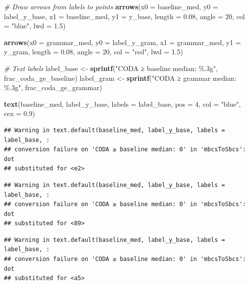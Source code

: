 \documentclass[
]{article}
\newenvironment{Shaded}{\begin{snugshade}}{\end{snugshade}}
\newcommand{\AttributeTok}[1]{\textcolor[rgb]{0.13,0.29,0.53}{#1}}
\newcommand{\CommentTok}[1]{\textcolor[rgb]{0.56,0.35,0.01}{\textit{#1}}}
\newcommand{\DecValTok}[1]{\textcolor[rgb]{0.00,0.00,0.81}{#1}}
\newcommand{\FloatTok}[1]{\textcolor[rgb]{0.00,0.00,0.81}{#1}}
\newcommand{\FunctionTok}[1]{\textcolor[rgb]{0.13,0.29,0.53}{\textbf{#1}}}
\newcommand{\NormalTok}[1]{#1}
\newcommand{\OtherTok}[1]{\textcolor[rgb]{0.56,0.35,0.01}{#1}}
\newcommand{\StringTok}[1]{\textcolor[rgb]{0.31,0.60,0.02}{#1}}
\begin{document}
\begin{Shaded}
\begin{Highlighting}[]
\CommentTok{\# Draw arrows from labels to points}
\FunctionTok{arrows}\NormalTok{(}\AttributeTok{x0 =}\NormalTok{ baseline\_med, }\AttributeTok{y0 =}\NormalTok{ label\_y\_base,}
       \AttributeTok{x1 =}\NormalTok{ baseline\_med, }\AttributeTok{y1 =}\NormalTok{ y\_base,}
       \AttributeTok{length =} \FloatTok{0.08}\NormalTok{, }\AttributeTok{angle =} \DecValTok{20}\NormalTok{, }\AttributeTok{col =} \StringTok{"blue"}\NormalTok{, }\AttributeTok{lwd =} \FloatTok{1.5}\NormalTok{)}

\FunctionTok{arrows}\NormalTok{(}\AttributeTok{x0 =}\NormalTok{ grammar\_med, }\AttributeTok{y0 =}\NormalTok{ label\_y\_gram,}
       \AttributeTok{x1 =}\NormalTok{ grammar\_med, }\AttributeTok{y1 =}\NormalTok{ y\_gram,}
       \AttributeTok{length =} \FloatTok{0.08}\NormalTok{, }\AttributeTok{angle =} \DecValTok{20}\NormalTok{, }\AttributeTok{col =} \StringTok{"red"}\NormalTok{, }\AttributeTok{lwd =} \FloatTok{1.5}\NormalTok{)}

\CommentTok{\# Text labels}
\NormalTok{label\_base }\OtherTok{\textless{}{-}} \FunctionTok{sprintf}\NormalTok{(}\StringTok{"CODA ≥ baseline median: \%.3g"}\NormalTok{, frac\_coda\_ge\_baseline)}
\NormalTok{label\_gram }\OtherTok{\textless{}{-}} \FunctionTok{sprintf}\NormalTok{(}\StringTok{"CODA ≥ grammar median: \%.3g"}\NormalTok{,  frac\_coda\_ge\_grammar)}

\FunctionTok{text}\NormalTok{(baseline\_med, label\_y\_base,}
     \AttributeTok{labels =}\NormalTok{ label\_base, }\AttributeTok{pos =} \DecValTok{4}\NormalTok{, }\AttributeTok{col =} \StringTok{"blue"}\NormalTok{, }\AttributeTok{cex =} \FloatTok{0.9}\NormalTok{)}
\end{Highlighting}
\end{Shaded}

\begin{verbatim}
## Warning in text.default(baseline_med, label_y_base, labels = label_base, :
## conversion failure on 'CODA ≥ baseline median: 0' in 'mbcsToSbcs': dot
## substituted for <e2>
\end{verbatim}

\begin{verbatim}
## Warning in text.default(baseline_med, label_y_base, labels = label_base, :
## conversion failure on 'CODA ≥ baseline median: 0' in 'mbcsToSbcs': dot
## substituted for <89>
\end{verbatim}

\begin{verbatim}
## Warning in text.default(baseline_med, label_y_base, labels = label_base, :
## conversion failure on 'CODA ≥ baseline median: 0' in 'mbcsToSbcs': dot
## substituted for <a5>
\end{verbatim}
\end{document}
